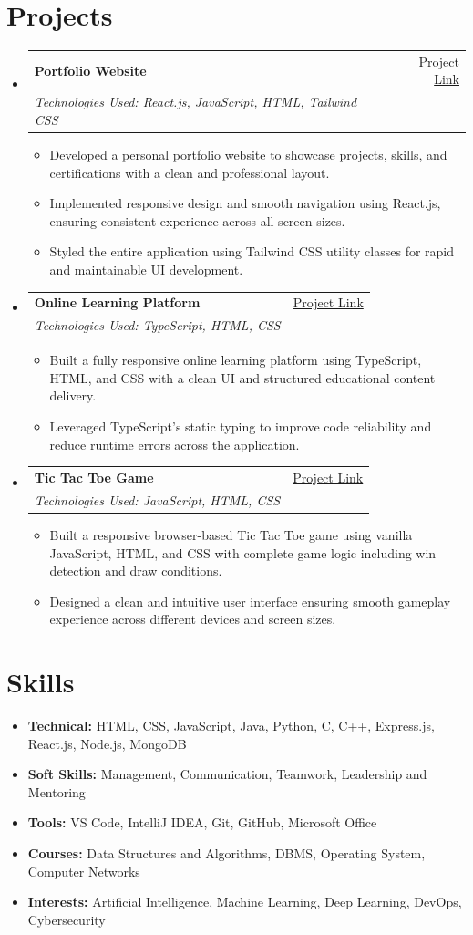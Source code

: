 \documentclass[letterpaper,10pt]{article}
\makeatletter
\newcommand{\resumeItem}[1]{\item\small{#1}}
\newcommand{\resumeSubheading}[4]{
  \vspace{-1pt}\item
  \begin{tabular*}{0.97\textwidth}[t]{l@{\extracolsep{\fill}}r}
    \textbf{#1} & \small #2 \\
    \textit{\small #3} & \textit{\small #4} \\
  \end{tabular*}\vspace{-4pt}
}
\newcommand{\resumeSubHeadingList}{\begin{itemize}[leftmargin=0.1in, label={}, itemsep=0pt, parsep=0pt, topsep=0pt]}
\newcommand{\resumeSubHeadingListEnd}{\end{itemize}}
\newcommand{\resumeItemList}{\begin{itemize}[leftmargin=0.25in, itemsep=0pt, parsep=0pt, topsep=1pt]}
\newcommand{\resumeItemListEnd}{\end{itemize}\vspace{1pt}}
\makeatother
\begin{document}
\section{Projects}
\resumeSubHeadingList

  \resumeSubheading{Portfolio Website}{\href{https://github.com/ShivBahadur007/PortFolio--Shiv}{Project Link}}
    {Technologies Used: React.js, JavaScript, HTML, Tailwind CSS}{}
  \resumeItemList
    \resumeItem{Developed a personal portfolio website to showcase projects, skills, and certifications with a clean and professional layout.}
    \resumeItem{Implemented responsive design and smooth navigation using React.js, ensuring consistent experience across all screen sizes.}
    \resumeItem{Styled the entire application using Tailwind CSS utility classes for rapid and maintainable UI development.}
  \resumeItemListEnd

  \resumeSubheading{Online Learning Platform}{\href{https://github.com/ShivBahadur007/Online_learning_platform}{Project Link}}
    {Technologies Used: TypeScript, HTML, CSS}{}
  \resumeItemList
    \resumeItem{Built a fully responsive online learning platform using TypeScript, HTML, and CSS with a clean UI and structured educational content delivery.}
    \resumeItem{Leveraged TypeScript's static typing to improve code reliability and reduce runtime errors across the application.}
  \resumeItemListEnd

  \resumeSubheading{Tic Tac Toe Game}{\href{https://github.com/ShivBahadur007/tic-tac-toe}{Project Link}}
    {Technologies Used: JavaScript, HTML, CSS}{}
  \resumeItemList
    \resumeItem{Built a responsive browser-based Tic Tac Toe game using vanilla JavaScript, HTML, and CSS with complete game logic including win detection and draw conditions.}
    \resumeItem{Designed a clean and intuitive user interface ensuring smooth gameplay experience across different devices and screen sizes.}
  \resumeItemListEnd

\resumeSubHeadingListEnd

\section{Skills}
\resumeSubHeadingList
  \resumeItem{\textbf{Technical:} HTML, CSS, JavaScript, Java, Python, C, C++, Express.js, React.js, Node.js, MongoDB}
  \resumeItem{\textbf{Soft Skills:} Management, Communication, Teamwork, Leadership and Mentoring}
  \resumeItem{\textbf{Tools:} VS Code, IntelliJ IDEA, Git, GitHub, Microsoft Office}
  \resumeItem{\textbf{Courses:} Data Structures and Algorithms, DBMS, Operating System, Computer Networks}
  \resumeItem{\textbf{Interests:} Artificial Intelligence, Machine Learning, Deep Learning, DevOps, Cybersecurity}
\resumeSubHeadingListEnd
\end{document}
